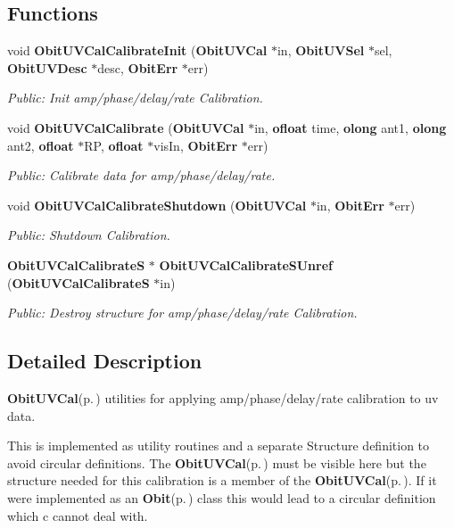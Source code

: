 \subsection*{Functions}
\begin{CompactItemize}
\item 
void {\bf Obit\-UVCal\-Calibrate\-Init} ({\bf Obit\-UVCal} $\ast$in, {\bf Obit\-UVSel} $\ast$sel, {\bf Obit\-UVDesc} $\ast$desc, {\bf Obit\-Err} $\ast$err)
\begin{CompactList}\small\item\em Public: Init amp/phase/delay/rate Calibration. \item\end{CompactList}\item 
void {\bf Obit\-UVCal\-Calibrate} ({\bf Obit\-UVCal} $\ast$in, {\bf ofloat} time, {\bf olong} ant1, {\bf olong} ant2, {\bf ofloat} $\ast$RP, {\bf ofloat} $\ast$vis\-In, {\bf Obit\-Err} $\ast$err)
\begin{CompactList}\small\item\em Public: Calibrate data for amp/phase/delay/rate. \item\end{CompactList}\item 
void {\bf Obit\-UVCal\-Calibrate\-Shutdown} ({\bf Obit\-UVCal} $\ast$in, {\bf Obit\-Err} $\ast$err)
\begin{CompactList}\small\item\em Public: Shutdown Calibration. \item\end{CompactList}\item 
{\bf Obit\-UVCal\-Calibrate\-S} $\ast$ {\bf Obit\-UVCal\-Calibrate\-SUnref} ({\bf Obit\-UVCal\-Calibrate\-S} $\ast$in)
\begin{CompactList}\small\item\em Public: Destroy structure for amp/phase/delay/rate Calibration. \item\end{CompactList}\end{CompactItemize}


\subsection{Detailed Description}
{\bf Obit\-UVCal}{\rm (p.\,\pageref{structObitUVCal})} utilities for applying amp/phase/delay/rate calibration to uv data. 

This is implemented as utility routines and a separate Structure definition to avoid circular definitions. The {\bf Obit\-UVCal}{\rm (p.\,\pageref{structObitUVCal})} must be visible here but the structure needed for this calibration is a member of the {\bf Obit\-UVCal}{\rm (p.\,\pageref{structObitUVCal})}. If it were implemented as an {\bf Obit}{\rm (p.\,\pageref{structObit})} class this would lead to a circular definition which c cannot deal with.

